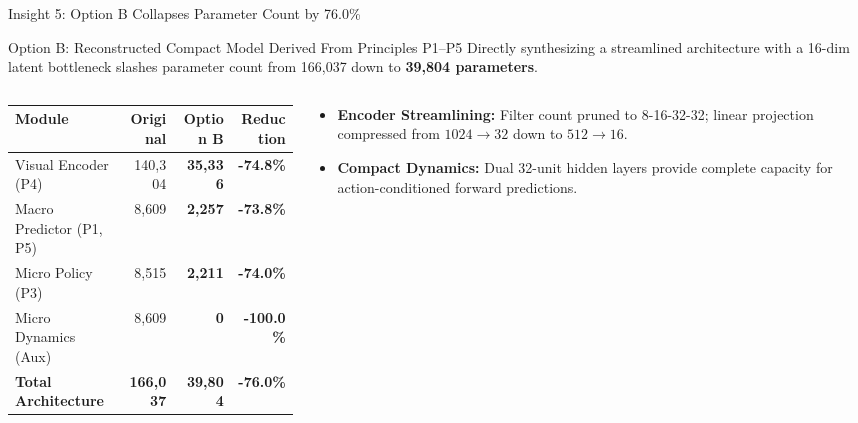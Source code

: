 \documentclass[aspectratio=169, 10pt]{beamer}
\begin{document}
\begin{frame}{Insight 5: Option B Collapses Parameter Count by 76.0\%}
  \begin{block}{Option B: Reconstructed Compact Model Derived From Principles P1--P5}
    Directly synthesizing a streamlined architecture with a 16-dim latent bottleneck slashes parameter count from 166,037 down to \textbf{39,804 parameters}.
  \end{block}
  \vspace{-0.2cm}
  \begin{columns}[T]
    \begin{column}{0.50\textwidth}
      \setlength{\tabcolsep}{3pt}
      \begin{table}
        \centering
        \scriptsize
        \begin{tabular}{lrrr}
          \toprule
          \textbf{Module} & \textbf{Original} & \textbf{Option B} & \textbf{Reduction} \\
          \midrule
          Visual Encoder (P4) & 140,304 & \textbf{35,336} & \textbf{-74.8\%} \\
          Macro Predictor (P1, P5) & 8,609 & \textbf{2,257} & \textbf{-73.8\%} \\
          Micro Policy (P3) & 8,515 & \textbf{2,211} & \textbf{-74.0\%} \\
          Micro Dynamics (Aux) & 8,609 & \textbf{0} & \textbf{-100.0\%} \\
          \midrule
          \textbf{Total Architecture} & \textbf{166,037} & \textbf{39,804} & \textbf{-76.0\%} \\
          \bottomrule
        \end{tabular}
      \end{table}
    \end{column}
    \begin{column}{0.46\textwidth}
      \begin{itemize}
        \item \textbf{Encoder Streamlining:} Filter count pruned to 8-16-32-32; linear projection compressed from $1024 \to 32$ down to $512 \to 16$.
        \item \textbf{Compact Dynamics:} Dual 32-unit hidden layers provide complete capacity for action-conditioned forward predictions.
      \end{itemize}
    \end{column}
  \end{columns}
\end{frame}
\end{document}
